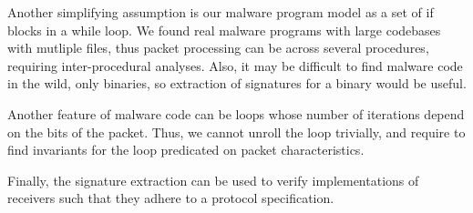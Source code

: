 \documentclass[twocolumn, 11pt]{paper}
\begin{document}
Another simplifying assumption is our malware program model 
as a set of if blocks in a while loop. We found real malware programs with
large codebases with mutliple files, thus packet processing can be 
across several procedures, requiring inter-procedural analyses.
Also, it may be difficult to find malware code in the wild, only binaries,
so extraction of signatures for a binary would be useful.

Another feature of malware code can be loops whose number 
of iterations depend on the bits of the packet. Thus, we cannot 
unroll the loop trivially, and require to find invariants for the loop 
predicated on packet characteristics. 

Finally, the signature extraction can be used to verify  
implementations of receivers such that they adhere to 
a protocol specification. 



\end{document}
